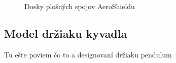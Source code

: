 \begin{figure}
\hfill
{}
\hfill
{}
\hfill
\caption{Dosky plošných spojov AeroShieldu}\label{OBRAZOK 2.7}
\end{figure}

\subsection{Model držiaku kyvadla}

Tu ešte poviem čo to a designovaní držiaku pendulum 
